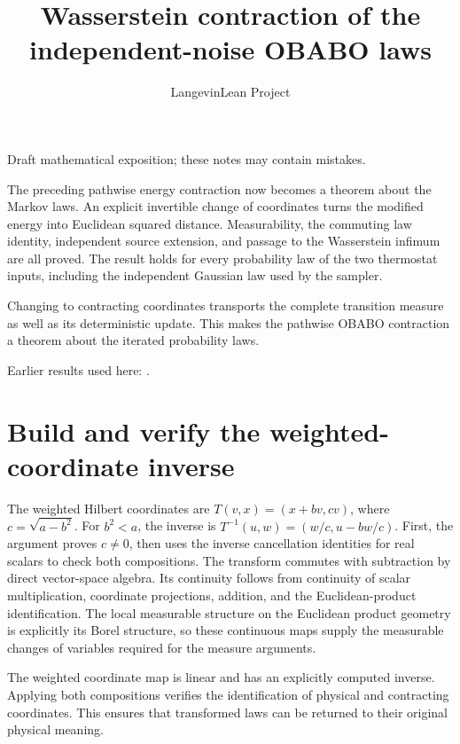 \documentclass[11pt,a4paper]{article}
\title{\texorpdfstring{Wasserstein contraction of the independent-noise OBABO laws}{Wasserstein contraction of the independent-noise OBABO laws}}
\author{LangevinLean Project}
\date{}
\begin{document}
\maketitle
Draft mathematical exposition; these notes may contain mistakes.


The preceding pathwise energy contraction now becomes a theorem about the Markov laws. An explicit invertible change of coordinates turns the modified energy into Euclidean squared distance. Measurability, the commuting law identity, independent source extension, and passage to the Wasserstein infimum are all proved. The result holds for every probability law of the two thermostat inputs, including the independent Gaussian law used by the sampler.



Changing to contracting coordinates transports the complete transition measure as well as its deterministic update. This makes the pathwise OBABO contraction a theorem about the iterated probability laws.



Earlier results used here: \cite[Section~3.33]{LangevinLean2026ULASC}.

\section{\texorpdfstring{Build and verify the weighted-coordinate inverse}{Build and verify the weighted-coordinate inverse}}


The weighted Hilbert coordinates are \(T(v,x)=(x+bv,c v)\), where \(c=\sqrt{a-b^2}\). For \(b^2<a\), the inverse is \(T^{-1}(u,w)=(w/c,u-bw/c)\). First, the argument proves \(c\ne0\), then uses the inverse cancellation identities for real scalars to check both compositions. The transform commutes with subtraction by direct vector-space algebra. Its continuity follows from continuity of scalar multiplication, coordinate projections, addition, and the Euclidean-product identification. The local measurable structure on the Euclidean product geometry is explicitly its Borel structure, so these continuous maps supply the measurable changes of variables required for the measure arguments.



The weighted coordinate map is linear and has an explicitly computed inverse. Applying both compositions verifies the identification of physical and contracting coordinates. This ensures that transformed laws can be returned to their original physical meaning.
\end{document}

